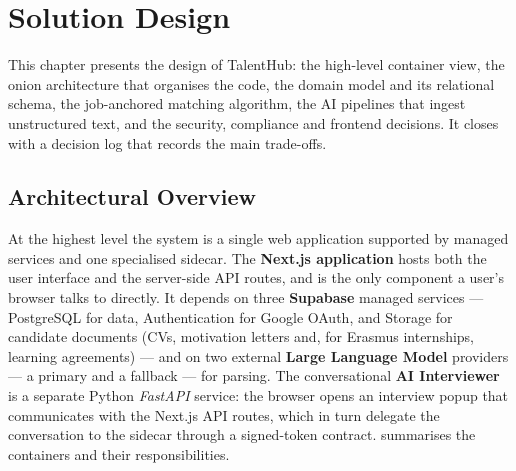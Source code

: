 ﻿\chapter{Solution Design}
\label{cap:design}

This chapter presents the design of TalentHub: the high-level container
view, the onion architecture that organises the code, the domain model and
its relational schema, the job-anchored matching algorithm, the AI pipelines
that ingest unstructured text, and the security, compliance and frontend
decisions. It closes with a decision log that records the main trade-offs.


\section{Architectural Overview}
\label{sec:design-overview}

At the highest level the system is a single web application supported by
managed services and one specialised sidecar. The \textbf{Next.js
application} hosts both the user interface and the server-side API routes,
and is the only component a user's browser talks to directly. It depends on
three \textbf{Supabase} managed services --- PostgreSQL for data,
Authentication for Google OAuth, and Storage for candidate documents (CVs,
motivation letters and, for Erasmus internships, learning agreements) --- and on two
external \textbf{Large Language Model} providers --- a primary and a
fallback --- for parsing. The conversational \textbf{AI Interviewer} is a
separate Python \textit{FastAPI} service: the browser opens an interview
popup that communicates with the Next.js API routes, which in turn delegate
the conversation to the sidecar through a signed-token contract.
 summarises the containers and their responsibilities.

